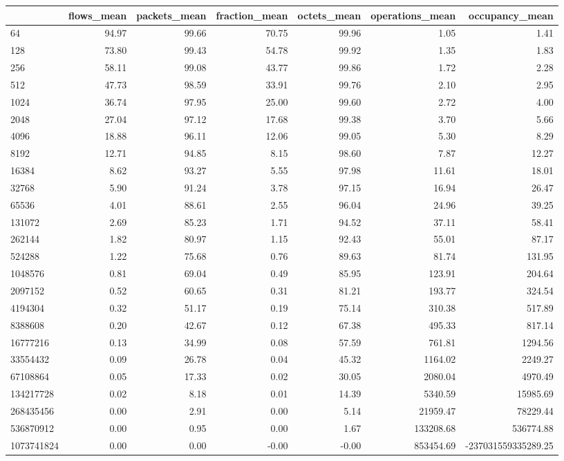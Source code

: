 \begin{tabular}{lrrrrrr}
\toprule
 & flows_mean & packets_mean & fraction_mean & octets_mean & operations_mean & occupancy_mean \\
\midrule
64 & 94.97 & 99.66 & 70.75 & 99.96 & 1.05 & 1.41 \\
128 & 73.80 & 99.43 & 54.78 & 99.92 & 1.35 & 1.83 \\
256 & 58.11 & 99.08 & 43.77 & 99.86 & 1.72 & 2.28 \\
512 & 47.73 & 98.59 & 33.91 & 99.76 & 2.10 & 2.95 \\
1024 & 36.74 & 97.95 & 25.00 & 99.60 & 2.72 & 4.00 \\
2048 & 27.04 & 97.12 & 17.68 & 99.38 & 3.70 & 5.66 \\
4096 & 18.88 & 96.11 & 12.06 & 99.05 & 5.30 & 8.29 \\
8192 & 12.71 & 94.85 & 8.15 & 98.60 & 7.87 & 12.27 \\
16384 & 8.62 & 93.27 & 5.55 & 97.98 & 11.61 & 18.01 \\
32768 & 5.90 & 91.24 & 3.78 & 97.15 & 16.94 & 26.47 \\
65536 & 4.01 & 88.61 & 2.55 & 96.04 & 24.96 & 39.25 \\
131072 & 2.69 & 85.23 & 1.71 & 94.52 & 37.11 & 58.41 \\
262144 & 1.82 & 80.97 & 1.15 & 92.43 & 55.01 & 87.17 \\
524288 & 1.22 & 75.68 & 0.76 & 89.63 & 81.74 & 131.95 \\
1048576 & 0.81 & 69.04 & 0.49 & 85.95 & 123.91 & 204.64 \\
2097152 & 0.52 & 60.65 & 0.31 & 81.21 & 193.77 & 324.54 \\
4194304 & 0.32 & 51.17 & 0.19 & 75.14 & 310.38 & 517.89 \\
8388608 & 0.20 & 42.67 & 0.12 & 67.38 & 495.33 & 817.14 \\
16777216 & 0.13 & 34.99 & 0.08 & 57.59 & 761.81 & 1294.56 \\
33554432 & 0.09 & 26.78 & 0.04 & 45.32 & 1164.02 & 2249.27 \\
67108864 & 0.05 & 17.33 & 0.02 & 30.05 & 2080.04 & 4970.49 \\
134217728 & 0.02 & 8.18 & 0.01 & 14.39 & 5340.59 & 15985.69 \\
268435456 & 0.00 & 2.91 & 0.00 & 5.14 & 21959.47 & 78229.44 \\
536870912 & 0.00 & 0.95 & 0.00 & 1.67 & 133208.68 & 536774.88 \\
1073741824 & 0.00 & 0.00 & -0.00 & -0.00 & 853454.69 & -237031559335289.25 \\
\bottomrule
\end{tabular}

